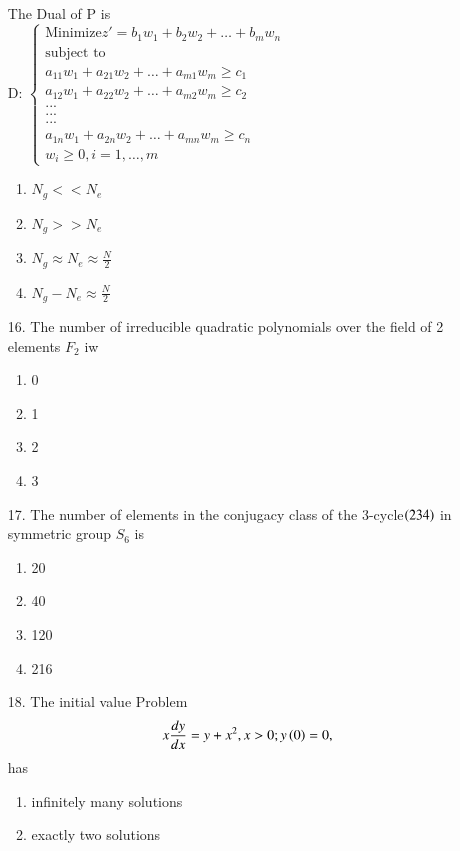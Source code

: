 \documentclass[journal]{IEEEtran}
\begin{document}
\begin{enumerate}
    \\The Dual of P is\\
    D: $\begin{cases} \text{Minimize} z' = b_1w_1+b_2w_2+\ldots+b_mw_n\\\text{subject to}\\a_{11}w_1+a_{21}w_2+\ldots+a_{m1}w_m \geq c_1\\a_{12}w_1+a_{22}w_2+\ldots+a_{m2}w_m \geq c_2\\.      .      .\\.      .      .\\.      .      .\\a_{1n}w_1+a_{2n}w_2+\ldots+a_{mn}w_m \geq c_n\\ w_i \geq 0, i=1,\ldots,m\end{cases}$
    \begin{enumerate}[label=(\Alph*)]
        \item $N_g<<N_e$
        \item $N_g>>N_e$
        \item $N_g\approx N_e\approx \frac{N}{2}$
        \item $N_g-N_e\approx \frac{N}{2}$
    \end{enumerate}
    \item[16.] The number of irreducible quadratic polynomials over the field of 2 elements $F_2$ iw
    \begin{enumerate}[label=(\Alph*)]
        \item 0
        \item 1
        \item 2
        \item 3
    \end{enumerate}
    \item[17.] The number of elements in the conjugacy class of the 3-cycle$\left(2 3 4\right)$ in symmetric group $S_6$ is
    \begin{enumerate}[label=(\Alph*)]
        \item 20
        \item 40 
        \item 120
        \item 216
    \end{enumerate}
    \item[18.] The initial value Problem
    $$x\frac{dy}{dx} = y + x^2, x>0; y\left(0\right) = 0,$$ has
    \begin{enumerate}[label=(\Alph*)]
        \item infinitely many solutions
        \item exactly two solutions

\end{enumerate}
\end{enumerate}
\end{document}

